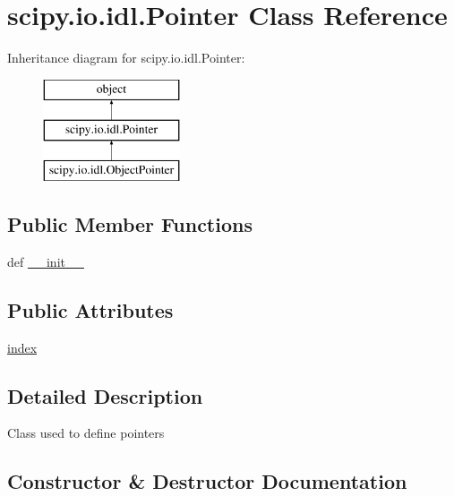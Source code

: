 \hypertarget{classscipy_1_1io_1_1idl_1_1Pointer}{}\section{scipy.\+io.\+idl.\+Pointer Class Reference}
\label{classscipy_1_1io_1_1idl_1_1Pointer}
Inheritance diagram for scipy.\+io.\+idl.\+Pointer\+:\begin{figure}[H]
\begin{center}
\leavevmode
\includegraphics[height=3.000000cm]{classscipy_1_1io_1_1idl_1_1Pointer}
\end{center}
\end{figure}
\subsection*{Public Member Functions}
\begin{DoxyCompactItemize}
\item 
def \hyperlink{classscipy_1_1io_1_1idl_1_1Pointer_a4c9f989c436996073cf436a0716a442a}{\+\_\+\+\_\+init\+\_\+\+\_\+}
\end{DoxyCompactItemize}
\subsection*{Public Attributes}
\begin{DoxyCompactItemize}
\item 
\hyperlink{classscipy_1_1io_1_1idl_1_1Pointer_a40ee65daf3bb0dae9509f1e57241243e}{index}
\end{DoxyCompactItemize}


\subsection{Detailed Description}
\begin{DoxyVerb}Class used to define pointers\end{DoxyVerb}
 

\subsection{Constructor \& Destructor Documentation}
\hypertarget{classscipy_1_1io_1_1idl_1_1Pointer_a4c9f989c436996073cf436a0716a442a}{}
